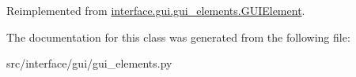 \-Reimplemented from \hyperlink{classinterface_1_1gui_1_1gui__elements_1_1_g_u_i_element_abd0d1220fd7cd0afdbfa415224a8a0af}{interface.\-gui.\-gui\-\_\-elements.\-G\-U\-I\-Element}.



\-The documentation for this class was generated from the following file\-:\begin{DoxyCompactItemize}
\item 
src/interface/gui/gui\-\_\-elements.\-py\end{DoxyCompactItemize}

